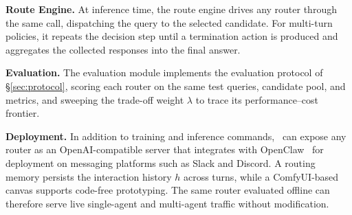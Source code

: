 \noindent\textbf{Route Engine.} At inference time, the route engine drives any router through the same call, dispatching the query to the selected candidate. For multi-turn policies, it repeats the decision step until a termination action is produced and aggregates the collected responses into the final answer.

\noindent\textbf{Evaluation.} The evaluation module implements the evaluation protocol of \S\ref{sec:protocol}, scoring each router on the same test queries, candidate pool, and metrics, and sweeping the trade-off weight $\lambda$ to trace its performance--cost frontier.

\noindent\textbf{Deployment.} In addition to training and inference commands, \method\ can expose any router as an OpenAI-compatible server that integrates with OpenClaw~\citep{openclaw2026} for deployment on messaging platforms such as Slack and Discord. A routing memory persists the interaction history $h$ across turns, while a ComfyUI-based canvas supports code-free prototyping. The same router evaluated offline can therefore serve live single-agent and multi-agent traffic without modification.



